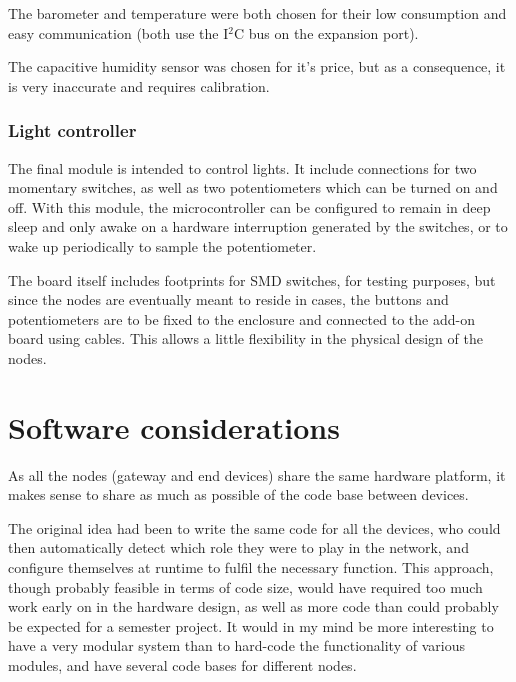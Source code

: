 The barometer and temperature were both chosen for their low consumption and
easy communication (both use the I$^{2}$C bus on the expansion port).

The capacitive humidity sensor was chosen for it's price, but as a consequence,
it is very inaccurate and requires calibration.

\subsubsection{Light controller}

The final module is intended to control lights. It include connections for two
momentary switches, as well as two potentiometers which can be turned on and
off. With this module, the microcontroller can be configured to remain in deep
sleep and only awake on a hardware interruption generated by the switches, or to
wake up periodically to sample the potentiometer.

The board itself includes footprints for SMD switches, for testing purposes, but
since the nodes are eventually meant to reside in cases, the buttons and
potentiometers are to be fixed to the enclosure and connected to the add-on
board using cables. This allows a little flexibility in the physical design of
the nodes.





\section{Software considerations}

As all the nodes (gateway and end devices) share the same hardware platform, it
makes sense to share as much as possible of the code base between devices.

The original idea had been to write the same code for all the devices, who could
then automatically detect which role they were to play in the network, and
configure themselves at runtime to fulfil the necessary function. This approach,
though probably feasible in terms of code size, would have required too much
work early on in the hardware design, as well as more code than could probably
be expected for a semester project. It would in my mind be more interesting to
have a very modular system than to hard-code the functionality of various
modules, and have several code bases for different nodes.

